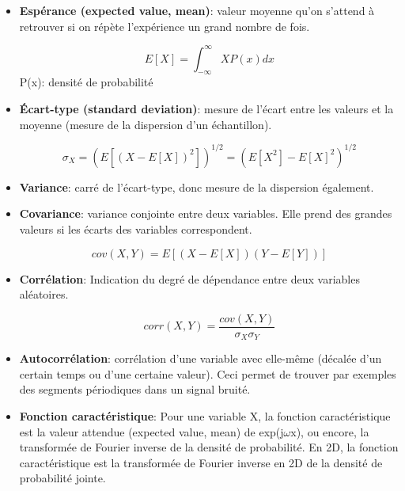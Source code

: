 \documentclass{article}       %
\begin{document}
\begin{itemize}
    \item \textbf{Espérance (expected value, mean)}: valeur moyenne qu'on s'attend à retrouver si on répète l'expérience un grand nombre de fois.
    
    \begin{equation*}
        E[X] = \int_{-\infty}^{\infty}X P(x) dx
    \end{equation*}
    P(x): densité de probabilité\\
    
    
    \item \textbf{Écart-type (standard deviation)}: mesure de l'écart entre les valeurs et la moyenne (mesure de la dispersion d'un échantillon).
    
    \begin{equation*}
        \sigma_X = \left(E[(X - E[X])^2]\right)^{1/2} = \left(E[X^2]-E[X]^2\right)^{1/2}
    \end{equation*}
    
    \bigskip
    
    
    \item\textbf{Variance}: carré de l'écart-type, donc mesure de la dispersion également.\\
    
    \item\textbf{Covariance}: variance conjointe entre deux variables. Elle prend des grandes valeurs si les écarts des variables correspondent.
    
    \begin{equation*}
        cov(X,Y) = E[(X-E[X])(Y-E[Y])]
    \end{equation*}
    
    \bigskip
    
    \item\textbf{Corrélation}: Indication du degré de dépendance entre deux variables aléatoires.
    
    \begin{equation*}
        corr(X,Y) = \frac{cov(X,Y)}{\sigma_{X}\sigma_{Y}}
    \end{equation*}
    
    \bigskip
    
    \item\textbf{Autocorrélation}: corrélation d'une variable avec elle-même (décalée d'un certain temps ou d'une certaine valeur). Ceci permet de trouver par exemples des segments périodiques dans un signal bruité.\\
    
    \item\textbf{Fonction caractéristique}: Pour une variable X, la fonction caractéristique est la valeur attendue (expected value, mean) de exp(j$\omega$x), ou encore, la transformée de Fourier inverse de la densité de probabilité. En 2D, la fonction caractéristique est la transformée de Fourier inverse en 2D de la densité de probabilité jointe.
    
    
    
\end{itemize}
\newpage
\end{document}
